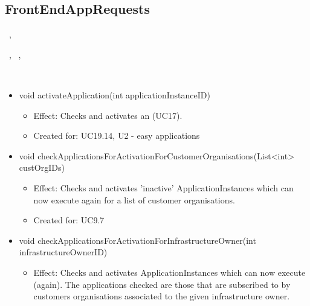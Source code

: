   \subsection{FrontEndAppRequests}\label{int:OnlineServiceOnlineServiceApplicationManagerApplicationManagementLogicFrontEndAppRequests}
    \begin{description}
      \item[Provided by:] \iconcomponent{}~, \iconcomponent{}~
      \item[Required by:] \iconcomponent{}~, \iconcomponent{}~, \iconcomponent{}~
      \item[Operations:] ~
    \begin{itemize}[noitemsep,nolistsep,leftmargin=-.25cm]
      \item \textsf{void activateApplication(int applicationInstanceID)}
        \begin{itemize}[noitemsep,nolistsep]
           \item Effect: Checks and activates an  (UC17).
\item Created for: UC19.14, U2 - easy applications
        \end{itemize}
      \item \textsf{void checkApplicationsForActivationForCustomerOrganisations(List\textless{}int\textgreater{} custOrgIDs)}
        \begin{itemize}[noitemsep,nolistsep]
           \item Effect: Checks and activates 'inactive' ApplicationInstances which can now execute again for a list of customer organisations.
\item Created for: UC9.7
        \end{itemize}
      \item \textsf{void checkApplicationsForActivationForInfrastructureOwner(int infrastructureOwnerID)}
        \begin{itemize}[noitemsep,nolistsep]
           \item Effect: Checks and activates ApplicationInstances which can now execute (again). The applications checked are those that are subscribed to by customers organisations associated to the given infrastructure owner.

\end{itemize}
\end{itemize}
\end{description}
